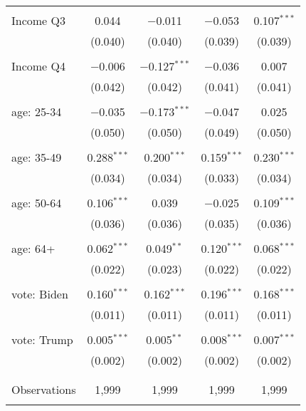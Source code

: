 \begin{tabular}{@{\extracolsep{5pt}}lcccc}
  & & & & \\ 
 Income Q3 & 0.044 & $-$0.011 & $-$0.053 & 0.107$^{***}$ \\ 
  & (0.040) & (0.040) & (0.039) & (0.039) \\ 
  & & & & \\ 
 Income Q4 & $-$0.006 & $-$0.127$^{***}$ & $-$0.036 & 0.007 \\ 
  & (0.042) & (0.042) & (0.041) & (0.041) \\ 
  & & & & \\ 
 age: 25-34 & $-$0.035 & $-$0.173$^{***}$ & $-$0.047 & 0.025 \\ 
  & (0.050) & (0.050) & (0.049) & (0.050) \\ 
  & & & & \\ 
 age: 35-49 & 0.288$^{***}$ & 0.200$^{***}$ & 0.159$^{***}$ & 0.230$^{***}$ \\ 
  & (0.034) & (0.034) & (0.033) & (0.034) \\ 
  & & & & \\ 
 age: 50-64 & 0.106$^{***}$ & 0.039 & $-$0.025 & 0.109$^{***}$ \\ 
  & (0.036) & (0.036) & (0.035) & (0.036) \\ 
  & & & & \\ 
 age: 64+ & 0.062$^{***}$ & 0.049$^{**}$ & 0.120$^{***}$ & 0.068$^{***}$ \\ 
  & (0.022) & (0.023) & (0.022) & (0.022) \\ 
  & & & & \\ 
 vote: Biden & 0.160$^{***}$ & 0.162$^{***}$ & 0.196$^{***}$ & 0.168$^{***}$ \\ 
  & (0.011) & (0.011) & (0.011) & (0.011) \\ 
  & & & & \\ 
 vote: Trump & 0.005$^{***}$ & 0.005$^{**}$ & 0.008$^{***}$ & 0.007$^{***}$ \\ 
  & (0.002) & (0.002) & (0.002) & (0.002) \\ 
  & & & & \\ 
\hline \\[-1.8ex] 

Observations & 1,999 & 1,999 & 1,999 & 1,999 \\ 
\hline 
\hline \\[-1.8ex] 
\end{tabular} 
